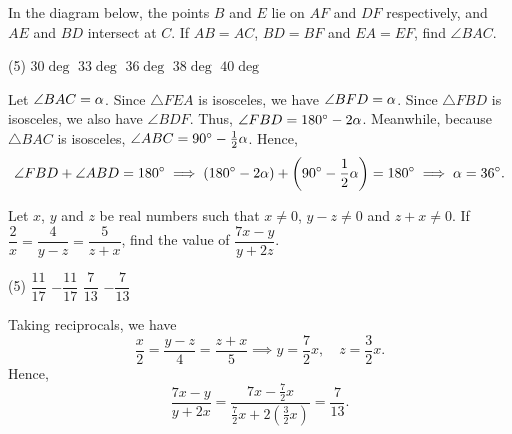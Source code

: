 \begin{question}[C]\label{Q::2024-J-1-4}
    In the diagram below, the points $B$ and $E$ lie on $AF$ and $DF$ respectively, and $AE$ and $BD$ intersect at $C$. If $AB = AC$, $BD = BF$ and $EA = EF$, find $\angle BAC$.
    \begin{center}
    \end{center}
    \begin{tasks}(5)
        \task $30\deg$
        \task $33\deg$
        \task $36\deg$
        \task $38\deg$
        \task $40\deg$
    \end{tasks}
\end{question}
\begin{solution*}
    Let $\angle BAC = \alpha$. Since $\triangle FEA$ is isosceles, we have $\angle BFD = \alpha$. Since $\triangle FBD$ is isosceles, we also have $\angle BDF$. Thus, $\angle FBD = 180^{\circ} - 2\alpha$. Meanwhile, because $\triangle BAC$ is isosceles, $\angle ABC = 90^{\circ} - \frac12 \alpha$. Hence, \[\angle FBD + \angle ABD = 180^{\circ} \implies \left( 180^{\circ} - 2\alpha \right) + \left( 90^{\circ} - \frac12 \alpha \right) = 180^{\circ} \implies \alpha = 36^{\circ}.\]
\end{solution*}

\begin{question}[C]\label{Q::2024-J-1-5}
    Let $x$, $y$ and $z$ be real numbers such that $x \neq 0$, $y - z \neq 0$ and $z + x \neq 0$. If $\dfrac{2}{x} = \dfrac{4}{y - z} = \dfrac{5}{z + x}$, find the value of $\dfrac{7x-y}{y+2z}$.
    \begin{tasks}(5)
        \task $\dfrac{11}{17}$
        \task $-\dfrac{11}{17}$
        \task $\dfrac{7}{13}$
        \task $-\dfrac{7}{13}$
    \end{tasks}
\end{question}
\begin{solution*}
    Taking reciprocals, we have \[\frac{x}{2} = \frac{y-z}{4} = \frac{z+x}{5} \implies y = \frac72 x, \quad z = \frac32 x.\] Hence, \[\frac{7x - y}{y + 2x} = \frac{7x - \frac72 x}{\frac72 x + 2(\frac32 x)} = \frac{7}{13}.\]
\end{solution*}

